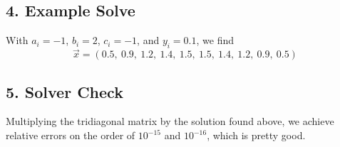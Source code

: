 \documentclass[12pt,a4paper,twoside]{article}
\begin{document}
\subsection*{4. Example Solve}
With $a_i=-1$, $b_i=2$, $c_i=-1$, and $y_i=0.1$, we find 
\begin{equation*}
\vec x = (0.5,~ 0.9,~ 1.2,~ 1.4, ~1.5, ~1.5,~ 1.4,~ 1.2,~ 0.9, ~0.5)
\end{equation*}

\subsection*{5. Solver Check}
Multiplying the tridiagonal matrix by the solution found above, we achieve relative errors on the order of $10^{-15}$ and $10^{-16}$, which is pretty good. 
\end{document}
